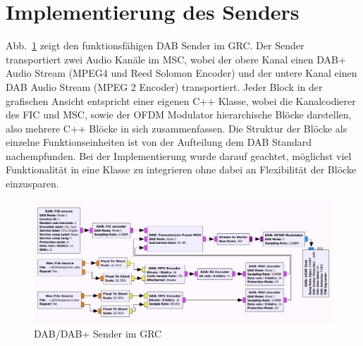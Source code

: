 \section{Implementierung des Senders}
\label{sec:imp_des_transmitters}
Abb.~\ref{fig:transmitter} zeigt den funktionsfähigen DAB Sender im GRC. Der Sender transportiert zwei Audio Kanäle im MSC, wobei der obere Kanal einen DAB+ Audio Stream (MPEG4 und Reed Solomon Encoder) und der untere Kanal einen DAB Audio Stream (MPEG 2 Encoder) transportiert. Jeder Block in der grafischen Ansicht entspricht einer eigenen C++ Klasse, wobei die Kanalcodierer des FIC und MSC, sowie der OFDM Modulator hierarchische Blöcke darstellen, also mehrere C++ Blöcke in sich zusammenfassen. Die Struktur der Blöcke als einzelne Funktionseinheiten ist von der Aufteilung dem DAB Standard nachempfunden. Bei der Implementierung wurde darauf geachtet, möglichst viel Funktionalität in eine Klasse zu integrieren ohne dabei an Flexibilität der Blöcke einzusparen.

\begin{figure}[ht]
\centering
  \includegraphics[width=\textwidth]{figures/GRC_transmitter.png}
	\caption{DAB/DAB+ Sender im GRC}
	\label{fig:transmitter}
\end{figure}

